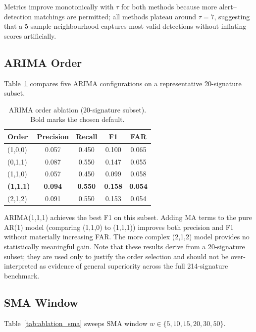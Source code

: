 \documentclass[pdflatex,sn-nature]{sn-jnl}
\theoremstyle{thmstyleone}%
\begin{document}
Metrics improve monotonically with $\tau$ for both methods because more
alert--detection matchings are permitted; all methods plateau around $\tau = 7$,
suggesting that a 5-sample neighbourhood captures most valid detections without
inflating scores artificially.

\subsection{ARIMA Order}\label{sec:ablation:order}

Table~\ref{tab:ablation_order} compares five ARIMA configurations on a
representative 20-signature subset.

\begin{table}[tbp]
\centering
\begin{tabular}{lcccc}
\toprule
Order & Precision & Recall & F1 & FAR \\
\midrule
(1,0,0) & 0.057 & 0.450 & 0.100 & 0.065 \\
(0,1,1) & 0.087 & 0.550 & 0.147 & 0.055 \\
(1,1,0) & 0.057 & 0.450 & 0.099 & 0.058 \\
\textbf{(1,1,1)} & \textbf{0.094} & \textbf{0.550} & \textbf{0.158} & \textbf{0.054} \\
(2,1,2) & 0.091 & 0.550 & 0.153 & 0.054 \\
\bottomrule
\end{tabular}
\caption{ARIMA order ablation (20-signature subset).
  Bold marks the chosen default.}
\label{tab:ablation_order}
\end{table}

ARIMA(1,1,1) achieves the best F1 on this subset.
Adding MA terms to the pure AR(1) model (comparing (1,1,0) to (1,1,1))
improves both precision and F1 without materially increasing FAR.
The more complex (2,1,2) model provides no statistically meaningful gain.
Note that these results derive from a 20-signature subset; they are
used only to justify the order selection and should not be over-interpreted
as evidence of general superiority across the full 214-signature benchmark.

\subsection{SMA Window}\label{sec:ablation:sma}

Table~\ref{tab:ablation_sma} sweeps SMA window $w \in \{5, 10, 15, 20, 30, 50\}$.
\end{document}
